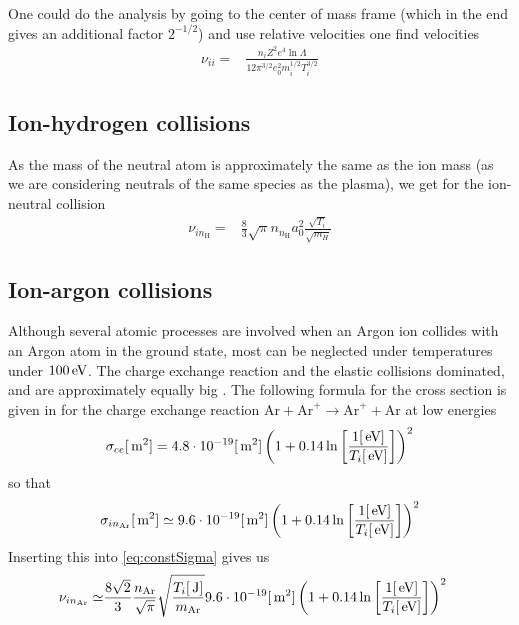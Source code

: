 One could do the analysis by going to the center of mass frame (which in the end gives an additional factor $2^{-1/2}$) and use relative velocities one find velocities
%
\begin{align*}
    \nu_{ii}
    =&
    \frac{n_iZ^2e^4\ln\Lambda}{12\pi^{3/2}e_0^2m_i^{1/2}T_i^{3/2}}
\end{align*}
%

\subsection{Ion-hydrogen collisions}
As the mass of the neutral atom is approximately the same as the ion mass (as we are considering neutrals of the same species as the plasma), we get for the ion-neutral collision
%
\begin{align*}
    \nu_{in_\text{H}}
    =&
    \frac{8}{3} \sqrt{\pi}
    n_{n_\text{H}} a_0^2
    \frac{\sqrt{T_i}}{\sqrt{m_H}}
\end{align*}

\subsection{Ion-argon collisions}
%
Although several atomic processes are involved when an Argon ion collides with an Argon atom in the ground state, most can be neglected under temperatures under $100 \, \text{eV}$.
The charge exchange reaction and the elastic collisions dominated, and are approximately equally big \cite{Lieberman2005}.
The following formula for the cross section is given in \cite{Anders1990} for the charge exchange reaction $\text{Ar}+\text{Ar}^+ \to\text{Ar}^+ +\text{Ar}$ at low energies
%
\begin{align*}
    \sigma_{ce}[\, \text{m}^2] = 4.8\cdot10^{-19}[\, \text{m}^2]\left(1+0.14\ln\left[\frac{1[\, \text{eV}]}{T_i[\, \text{eV}]}\right]\right)^2
\end{align*}
%
so that
%
\begin{align*}
    \sigma_{in_\text{Ar}}[\, \text{m}^2] \simeq 9.6\cdot10^{-19}[\, \text{m}^2]\left(1+0.14\ln\left[\frac{1[\, \text{eV}]}{T_i[\, \text{eV}]}\right]\right)^2
\end{align*}
%
Inserting this into \cref{eq:constSigma} gives us
%
\begin{align*}
    \nu_{in_\text{Ar}}
    \simeq&
    \frac{8\sqrt{2}}{3}
    \frac{n_{\text{Ar}}}{\sqrt{\pi}}
    \sqrt{ \frac{T_i[\, \text{J}]}{m_{\text{Ar}}}}
    9.6\cdot10^{-19}[\, \text{m}^2]\left(1+0.14\ln\left[\frac{1[\, \text{eV}]}{T_i[\, \text{eV}]}\right]\right)^2
\end{align*}
